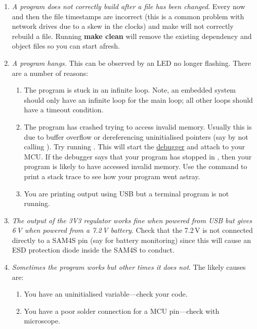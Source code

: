 \begin{enumerate}
\begin{enumerate}
\item
  \emph{A program does not correctly build after a file has been
    changed}. Every now and then the file timestamps are incorrect
  (this is a common problem with network drives due to a skew in the
  clocks) and make will not correctly rebuild a file. Running
  \textbf{make clean} will remove the existing dependency and object
  files so you can start afresh.

\item
  \emph{A program hangs.} This can be observed by an LED no longer
  flashing. There are a number of reasons:

  \begin{enumerate}
  \item
    The program is stuck in an infinite loop. Note, an embedded system
    should only have an infinite loop for the main loop; all other loops
    should have a timeout condition.
  \item
    The program has crashed trying to access invalid memory. Usually
    this is due to buffer overflow or dereferencing uninitialised
    pointers (say by not calling ). Try running
    .  This will start the
    \protect\hyperref[debugging]{debugger} and attach to your MCU. If
    the debugger says that your program has stopped in
    , then your program is likely to have
    accessed invalid memory. Use the  command to print a
    stack trace to see how your program went astray.

  \item You are printing output using USB but a terminal program is
    not running.
  \end{enumerate}

\item
  \emph{The output of the 3V3 regulator works fine when powered from
    USB but gives 6\,V when powered from a 7.2\,V battery}. Check that
  the 7.2\,V is not connected directly to a SAM4S pin (say for battery
  monitoring) since this will cause an ESD protection diode inside the
  SAM4S to conduct.

\item \emph{Sometimes the program works but other times it does not}.
  The likely causes are:
  \begin{enumerate}
  \item You have an uninitialised variable---check your code.

  \item You have a poor solder connection for a MCU pin---check with
    microscope.


\end{enumerate}
\end{enumerate}
\end{enumerate}
